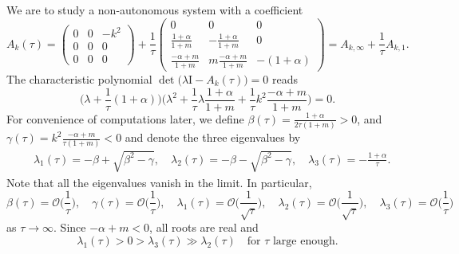\documentclass[a4paper,11pt]{article}
\theoremstyle{remark}
\begin{document}
We are to study a non-autonomous system with a coefficient
\begin{equation} \label{eq:n0A}
  A_k(\tau)=\begin{pmatrix}
   0 & 0 & -k^2\\
   0 & 0 & 0\\
   0 & 0 & 0
  \end{pmatrix}
  + \frac{1}{\tau}   \begin{pmatrix}
   0 & 0 & 0\\
   \frac{1+\alpha}{1+m} & -\frac{1+\alpha}{1+m} & 0\\
   \frac{-\alpha+m}{1+m} & m\frac{-\alpha+m}{1+m}& -(1+\alpha)
  \end{pmatrix} = A_{k,\infty} + \frac{1}{\tau}A_{k,1}.
\end{equation}
The characteristic polynomial $\det\big(\lambda \textrm{I} - A_k(\tau)\big)=0$ reads
$$ \Big(\lambda +\frac{1}{\tau}(1+\alpha)\Big)\Big( \lambda^2 + \frac{1}{\tau}\lambda \frac{1+\alpha}{1+m} + \frac{1}{\tau} k^2 \frac{-\alpha+m}{1+m}\Big)=0.$$
For convenience of computations later, we define $\beta(\tau) = \frac{1+\alpha}{2\tau(1+m)}>0$, and $\gamma(\tau)= k^2\frac{-\alpha+m}{\tau(1+m)}<0$ and denote the three eigenvalues by
\begin{equation} \label{eq:inviscid_roots}
\begin{aligned}
 &\lambda_1(\tau) = -\beta + \sqrt{\beta^2-\gamma}, \quad \lambda_2(\tau) = -\beta - \sqrt{\beta^2-\gamma}, \quad \lambda_3(\tau) = -\frac{1+\alpha}{\tau}.
\end{aligned}
\end{equation}
Note that all the eigenvalues vanish in the limit. In particular,
$$ \beta(\tau)=\mathcal{O}\Big(\frac{1}{\tau}\Big), \quad \gamma(\tau)=\mathcal{O}\Big(\frac{1}{\tau}\Big), \quad \lambda_1(\tau)=\mathcal{O}\Big(\frac{1}{\sqrt{\tau}}\Big), \quad \lambda_2(\tau)=\mathcal{O}\Big(\frac{1}{\sqrt{\tau}}\Big), \quad\lambda_3(\tau)=\mathcal{O}\Big(\frac{1}{\tau}\Big)$$
as $\tau \rightarrow \infty$. Since $-\alpha+m<0$, all roots are real and
$$\lambda_1(\tau) > 0 > \lambda_3(\tau) \gg \lambda_2(\tau) \quad \text{for $\tau$ large enough.}$$

%
\end{document}
